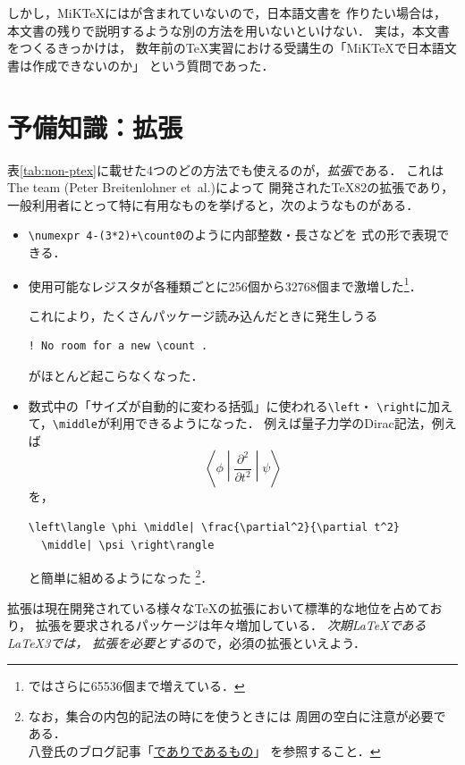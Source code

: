 \documentclass[b5paper]{bxjsarticle} %
\begin{document}
しかし，MiK\TeX には\pLaTeX が含まれていないので，日本語文書を
作りたい場合は，本文書の残りで説明するような別の方法を用いないといけない．
実は，本文書をつくるきっかけは，
数年前の\TeX 実習における受講生の「MiK\TeX で日本語文書は作成できないのか」
という質問であった．



\newpage

\section{予備知識：\eTeX 拡張}
\label{sec:etex}
表\>\ref{tab:non-ptex}\>に載せた4つのどの方法でも使えるのが，\emph{\eTeX 拡張}である．
これはThe \NTS{} team (Peter Breitenlohner et~al.)によって
開発された\TeX82の拡張であり，
一般利用者にとって特に有用なものを挙げると，次のようなものがある．
\begin{itemize}
\item \verb!\numexpr 4-(3*2)+\count0!のように内部整数・長さなどを
  式の形で表現できる．
\item 使用可能なレジスタが各種類ごとに256個から32768個まで激増した\footnote{%
  \LuaTeX{}ではさらに65536個まで増えている．}．

これにより，たくさんパッケージ読み込んだときに発生しうる
\begin{lstlisting}
! No room for a new \count .
\end{lstlisting}
がほとんど起こらなくなった．

\item 数式中の「サイズが自動的に変わる括弧」に使われる\verb+\left+・
  \verb+\right+に加えて，\verb+\middle+が利用できるようになった．
  例えば量子力学のDirac記法，例えば
\[
 \left\langle \phi \middle| \frac{\partial^2}{\partial t^2} \middle| \psi \right\rangle
\]
を，
\begin{lstlisting}
\left\langle \phi \middle| \frac{\partial^2}{\partial t^2}
  \middle| \psi \right\rangle
\end{lstlisting}
  と簡単に組めるようになった%
  \footnote{なお，集合の内包的記法の時にを使うときには
  周囲の空白に注意が必要である．\\
  八登氏のブログ記事「\href{https://zrbabbler.hatenablog.com/entry/20120411/1334151482}%
  {でありであるもの}」
  を参照すること．}．
\end{itemize}
\eTeX 拡張は現在開発されている様々な\TeX の拡張において標準的な地位を占めており，
\eTeX 拡張を要求されるパッケージは年々増加している．
\emph{次期\LaTeX である\LaTeX3では，
\eTeX 拡張を必要とする}ので，必須の拡張といえよう．
\end{document}
